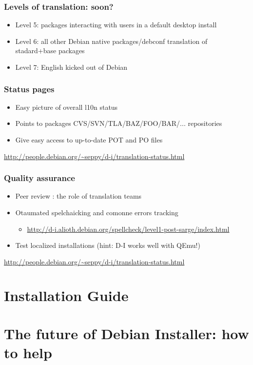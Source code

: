 \documentclass{beamer}
\begin{document}
\begin{frame}
  \frametitle{Levels of translation: soon?}
	\begin{itemize}
	\item
		Level 5: packages interacting with users in a default desktop install
	\item
		Level 6: all other Debian native packages/debconf translation of stadard+base packages
	\item
		Level 7: English kicked out of Debian
	\end{itemize}
\end{frame}

\begin{frame}
  \frametitle{Status pages}
	\begin{itemize}
	\item
		Easy picture of overall l10n status 
	\item
		Points to packages CVS/SVN/TLA/BAZ/FOO/BAR/... repositories
	\item
		Give easy access to up-to-date POT and PO files
	\end{itemize}

\url{http://people.debian.org/~seppy/d-i/translation-status.html}

\end{frame}

\begin{frame}
  \frametitle{Quality assurance}
	\begin{itemize}
	\item
		Peer review : the role of translation teams
	\item
		Otaumated spelchaicking and comonne errors tracking
		\begin{itemize}
			\item
				\url{http://d-i.alioth.debian.org/spellcheck/level1-post-sarge/index.html}
		\end{itemize}
	\item
		Test localized installations (hint: D-I works well with QEmu!)
	\end{itemize}

\url{http://people.debian.org/~seppy/d-i/translation-status.html}

\end{frame}


\section{Installation Guide}

\begin{frame}
  \frametitle{}
\end{frame}


\section{The future of Debian Installer: how to help}

\begin{frame}
  \frametitle{}
\end{frame}
\end{document}
